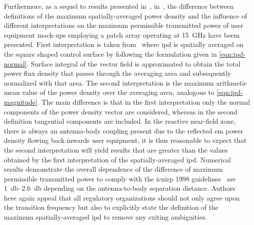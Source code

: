 Furthermore, as a sequel to results presented in~\cite{Colombi2015,Thors2016Exposure}, in~\cite{Xu2017Understanding}, the difference between definitions of the maximum spatially-averaged power density and the influence of different interpretations on the maximum permissible transmitted power of user equipment mock-ups employing a patch array operating at \SI{15}{\GHz} have beem presented.
First interpretation is taken from~\cite{Thors2016Exposure} where \gls{ipd} is spatially averaged on the square shaped control surface by following the formulation given in \cref{eqn:ipd-normal}.
Surface integral of the vector field is approximated to obtain the total power flux density that passes through the averaging area and subsequently normalized with that area.
The second interpretation is the maximum arithmetic mean value of the power density over the averaging area, analogous to \cref{eqn:ipd-magnitude}.
The main difference is that in the first interpretation only the normal components of the power density vector are considered, whereas in the second definition tangential components are included.
In the reactive near-field zone, there is always an antenna-body coupling present due to the reflected \gls{em} power density flowing back inwards user equipment, it is thus reasonable to expect that the second interpretation will yield results that are greater than the values obtained by the first interpretation of the spatially-averaged \gls{ipd}.
Numerical results demonstrate the overall dependence of the difference of maximum permissible transmitted power to comply with the \gls{icnirp} 1998 guidelines~\cite{ICNIRP1998Guidlines} are \SIrange[range-units=single,range-phrase=--]{1}{2.6}{\decibel} depending on the antenna-to-body separation distance.
Authors here again appeal that all regulatory organizations should not only agree upon the transition frequency but also to explicitly state the definition of the maximum spatially-averaged \gls{ipd} to remove any exiting ambiguities.

